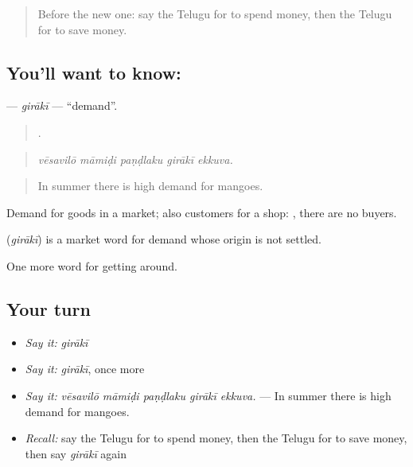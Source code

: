 \label{lesson:TE-C487-giraki}



\begin{quote}
Before the new one: say the Telugu for to spend money, then the Telugu for to save money.
\end{quote}

\subsection*{You'll want to know: }
\textbf{} — \emph{girākī} — \textquotedblleft{}demand\textquotedblright{}.

\begin{quote}
    .
\end{quote}

\begin{quote}
\emph{vēsavilō māmiḍi paṇḍlaku girākī ekkuva.}
\end{quote}

\begin{quote}
In summer there is high demand for mangoes.
\end{quote}

Demand for goods in a market; also customers for a shop:  , there are no buyers.

\begin{cousinweb}
\textbf{} (\emph{girākī}) is a market word for demand whose origin is not settled.
\end{cousinweb}

\begin{grammarlens}[title={What you've built}]
One more word for getting around.
\end{grammarlens}

\subsection*{Your turn}
\begin{itemize}
\raggedright
  \item \emph{Say it:} \emph{girākī}
  \item \emph{Say it:} \emph{girākī}, once more
  \item \emph{Say it:} \emph{vēsavilō māmiḍi paṇḍlaku girākī ekkuva.} — In summer there is high demand for mangoes.
  \item \emph{Recall:} say the Telugu for to spend money, then the Telugu for to save money, then say \emph{girākī} again
\end{itemize}

